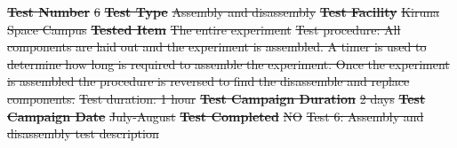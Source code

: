 \documentclass[a4paper,12pt,twoside, final]{article}
\providecommand{\DIFdeltex}[1]{{\protect\color{red}\sout{#1}}}                      %
\providecommand{\DIFdelFL}[1]{\DIFdel{#1}} %
\providecommand{\DIFdelbeginFL}{} %
\providecommand{\DIFdel}[1]{\texorpdfstring{\DIFdeltex{#1}}{}} %
\newcommand{\DIFscaledelfig}{0.5}
\newlength{\DIFdelgraphicswidth} %
\newlength{\DIFdelgraphicsheight} %
\newcommand{\DIFdelincludegraphics}[2][]{%
\sbox{\DIFdelgraphicsbox}{\DIFOincludegraphics[#1]{#2}}%
\settoboxwidth{\DIFdelgraphicswidth}{\DIFdelgraphicsbox} %
\settoboxtotalheight{\DIFdelgraphicsheight}{\DIFdelgraphicsbox} %
\scalebox{\DIFscaledelfig}{%
\parbox[b]{\DIFdelgraphicswidth}{\usebox{\DIFdelgraphicsbox}\\[-\baselineskip] \rule{\DIFdelgraphicswidth}{0em}}\llap{\resizebox{\DIFdelgraphicswidth}{\DIFdelgraphicsheight}{%
\setlength{\unitlength}{\DIFdelgraphicswidth}%
\begin{picture}(1,1)%
\thicklines\linethickness{2pt} %
{\color[rgb]{1,0,0}\put(0,0){\framebox(1,1){}}}%
{\color[rgb]{1,0,0}\put(0,0){\line( 1,1){1}}}%
{\color[rgb]{1,0,0}\put(0,1){\line(1,-1){1}}}%
\end{picture}%
}\hspace*{3pt}}} %
} %
\DeclareRobustCommand{\DIFdelbeginFL}{\DIFOdelbeginFL \let\includegraphics\DIFdelincludegraphics} %
\begin{document}
\DIFdelbeginFL %
\textbf{\DIFdelFL{Test Number}} %
\DIFdelFL{6 }%
\textbf{\DIFdelFL{Test Type}} %
\DIFdelFL{Assembly and disassembly }%
\textbf{\DIFdelFL{Test Facility}} %
\DIFdelFL{Kiruna Space Campus }%
\textbf{\DIFdelFL{Tested Item}} %
\DIFdelFL{The entire experiment }%
\DIFdelFL{Test procedure: All components are laid out and the experiment is assembled. A timer is used to determine how long is required to assemble the experiment. Once the experiment is assembled the procedure is reversed to find the disassemble and replace components.}%
\DIFdelFL{Test duration: 1 hour }%
\textbf{\DIFdelFL{Test Campaign Duration}} %
\DIFdelFL{2 days }%
\textbf{\DIFdelFL{Test Campaign Date}} %
\DIFdelFL{July-August }%
\textbf{\DIFdelFL{Test Completed}} %
\DIFdelFL{NO }%
{%
\DIFdelFL{Test 6: Assembly and disassembly test description}}

\end{document}
